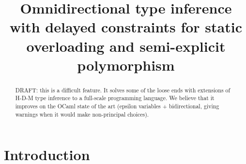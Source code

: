 \documentclass[acmsmall,screen,nonacm]{acmart}
\begin{document}
\title{Omnidirectional type inference with delayed constraints
   for static overloading and semi-explicit polymorphism}

\begin{abstract}


  DRAFT: this is a difficult feature. It solves some of the loose ends
  with extensions of H-D-M type inference to a full-scale programming
  language. We believe that it improves on the OCaml state of the art
  (epsilon variables + bidirectional, giving warnings when it would
  make non-principal choices).
\end{abstract}


\maketitle

\section{Introduction}
\end{document}
